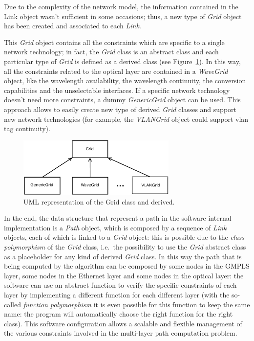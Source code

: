 \documentclass[10pt,a4paper]{report}
\begin{document}
Due to the complexity of the network model, the information contained
in the Link object wasn't sufficient in some occasions; thus, a new
type of \textit{Grid} object has been created and associated to each
\textit{Link}.

This \textit{Grid} object contains all the constraints which are
specific to a single network technology; in fact, the \textit{Grid}
class is an abstract class and each particular type of \textit{Grid}
is defined as a derived class (see Figure~\ref{fig:grid_uml}). In this
way, all the constraints related to the optical layer are contained in
a \textit{WaveGrid} object, like the wavelength availability, the
wavelength continuity, the conversion capabilities and the
unselectable interfaces. If a specific network technology doesn't need
more constraints, a dummy \textit{GenericGrid} object can be
used. This approach allows to easily create new type of derived
\textit{Grid} classes and support new network technologies (for
example, the \textit{VLANGrid} object could support vlan tag
continuity).

\begin{figure}[!htbp]
  \begin{center}
    \includegraphics[width=0.7\textwidth]{img/grid_uml}
    \caption[Grid UML Diagram]{UML representation of the Grid class
      and derived.}
    \label{fig:grid_uml}
  \end{center}
\end{figure}

In the end, the data structure that represent a path in the software
internal implementation is a \textit{Path} object, which is composed
by a sequence of \textit{Link} objects, each of which is linked to a
\textit{Grid} object: this is possible due to the \textit{class
  polymorphism} of the \textit{Grid} class, i.e.\ the possibility to
use the \textit{Grid} abstract class as a placeholder for any kind of
derived \textit{Grid} class. In this way the path that is being
computed by the algorithm can be composed by some nodes in the GMPLS
layer, some nodes in the Ethernet layer and some nodes in the optical
layer: the software can use an abstract function to verify the
specific constraints of each layer by implementing a different
function for each different layer (with the so-called \textit{function
  polymorphism} it is even possible for this function to keep the same
name: the program will automatically choose the right function for the
right class). This software configuration allows a scalable and
flexible management of the various constraints involved in the
multi-layer path computation problem.
\end{document}
